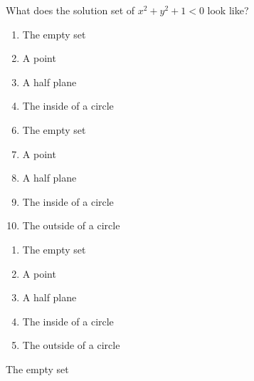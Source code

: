 

  What does the solution set of $x^{2}+y^{2}+1<0$ look like?


\ifsat
	\begin{enumerate}[label=\Alph*)]
		\item   The empty set %
		\item  A point
		\item  A half plane 
		\item  The inside of a circle
	\end{enumerate}
\else
\fi

\ifacteven
	\begin{enumerate}[label=\textbf{\Alph*.},itemsep=\fill,align=left]
		\setcounter{enumii}{5}
		\item   The empty set %
		\item  A point
		\item  A half plane 
		\addtocounter{enumii}{1}
		\item  The inside of a circle
		\item  The outside of a circle
	\end{enumerate}
\else
\fi

\ifactodd
	\begin{enumerate}[label=\textbf{\Alph*.},itemsep=\fill,align=left]
		\item   The empty set %
		\item  A point
		\item  A half plane 
		\item  The inside of a circle
		\item  The outside of a circle
	\end{enumerate}
\else
\fi

\ifgridin
   The empty set %
		
\else
\fi

